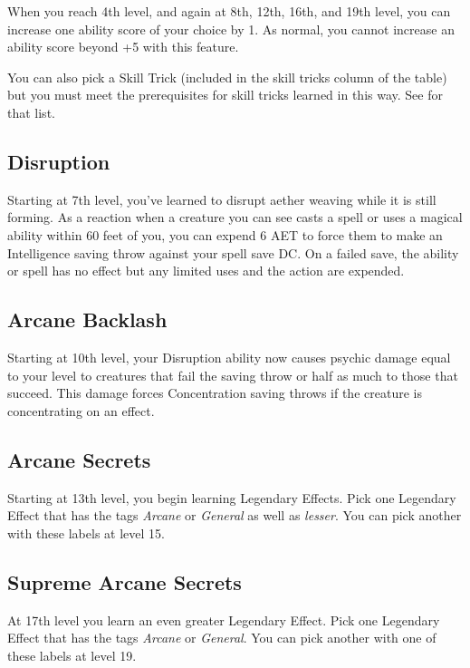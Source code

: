 When you reach 4th level, and again at 8th, 12th, 16th, and 19th level, you can increase one ability score of your choice by 1. As normal, you cannot increase an ability score beyond +5 with this feature.

You can also pick a Skill Trick (included in the skill tricks column of the  table) but you must meet the prerequisites for skill tricks learned in this way. See  for that list.

\subsection{Disruption}

Starting at 7th level, you've learned to disrupt aether weaving while it is still forming. As a reaction when a creature you can see casts a spell or uses a magical ability within 60 feet of you, you can expend 6 AET to force them to make an Intelligence saving throw against your spell save DC. On a failed save, the ability or spell has no effect but any limited uses and the action are expended.

\subsection{Arcane Backlash}

Starting at 10th level, your Disruption ability now causes psychic damage equal to your level to creatures that fail the saving throw or half as much to those that succeed. This damage forces Concentration saving throws if the creature is concentrating on an effect.

\subsection{Arcane Secrets}
Starting at 13th level, you begin learning Legendary Effects. Pick one Legendary Effect that has the tags \textit{Arcane} or \textit{General} as well as \textit{lesser}. You can pick another with these labels at level 15.

\subsection{Supreme Arcane Secrets}
At 17th level you learn an even greater Legendary Effect. Pick one Legendary Effect that has the tags \textit{Arcane} or \textit{General}. You can pick another with one of these labels at level 19.

